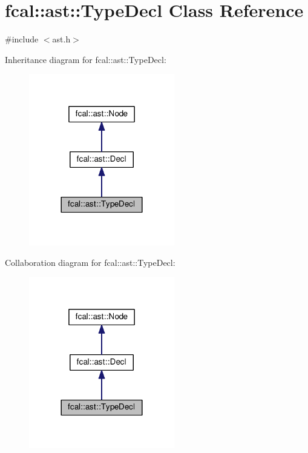 \hypertarget{classfcal_1_1ast_1_1TypeDecl}{}\section{fcal\+:\+:ast\+:\+:Type\+Decl Class Reference}
\label{classfcal_1_1ast_1_1TypeDecl}


{\ttfamily \#include $<$ast.\+h$>$}



Inheritance diagram for fcal\+:\+:ast\+:\+:Type\+Decl\+:\nopagebreak
\begin{figure}[H]
\begin{center}
\leavevmode
\includegraphics[width=180pt]{classfcal_1_1ast_1_1TypeDecl__inherit__graph}
\end{center}
\end{figure}


Collaboration diagram for fcal\+:\+:ast\+:\+:Type\+Decl\+:\nopagebreak
\begin{figure}[H]
\begin{center}
\leavevmode
\includegraphics[width=180pt]{classfcal_1_1ast_1_1TypeDecl__coll__graph}
\end{center}
\end{figure}
